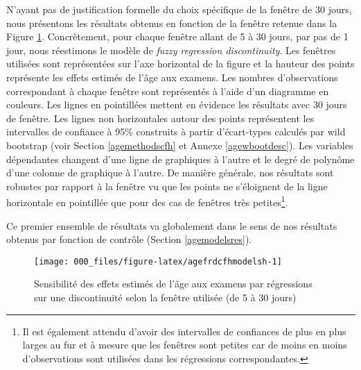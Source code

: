\documentclass[
]{book}
\begin{document}
\endgroup{}

\quad N'ayant pas de justification formelle du choix spécifique de la fenêtre de 30 jours, nous présentons les résultats obtenus en fonction de la fenêtre retenue dans la Figure \ref{fig:agefrdcfhmodelsh}. Concrètement, pour chaque fenêtre allant de 5 à 30 jours, par pas de 1 jour, nous réestimons le modèle de \emph{fuzzy regression discontinuity}. Les fenêtres utilisées sont représentées sur l'axe horizontal de la figure et la hauteur des points représente les effets estimés de l'âge aux examens. Les nombres d'observations correspondant à chaque fenêtre sont représentés à l'aide d'un diagramme en couleurs. Les lignes en pointillées mettent en évidence les résultats avec 30 jours de fenêtre. Les lignes non horizontales autour des points représentent les intervalles de confiance à 95\% construits à partir d'écart-types calculés par wild bootstrap (voir Section \ref{agemethodscfh} et Annexe \ref{agewbootdesc}). Les variables dépendantes changent d'une ligne de graphiques à l'autre et le degré de polynôme d'une colonne de graphique à l'autre.
De manière générale, nos résultats sont robustes par rapport à la fenêtre vu que les points ne s'éloignent de la ligne horizontale en pointillée que pour des cas de fenêtres très petites\footnote{Il est également attendu d'avoir des intervalles de confiances de plus en plus larges au fur et à mesure que les fenêtres sont petites car de moins en moins d'observations sont utilisées dans les régressions correspondantes.}.

\quad Ce premier ensemble de résultats va globalement dans le sens de nos résultats obtenus par fonction de contrôle (Section \ref{agemodelsres}).

\begin{figure}[H]

{\centering \texttt{[image: 000\_files/figure-latex/agefrdcfhmodelsh-1]} 

}

\caption{Sensibilité des effets estimés de l'âge aux examens par régressions sur une discontinuité selon la fenêtre utilisée (de 5 à 30 jours)}\label{fig:agefrdcfhmodelsh}
\end{figure}
\end{document}

